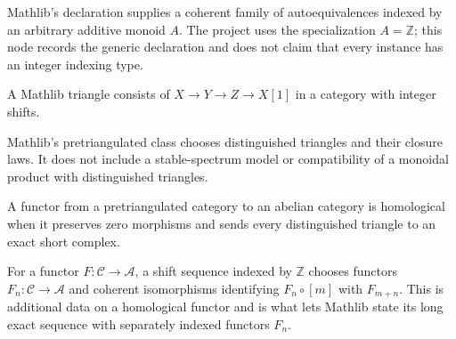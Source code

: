 \begin{definition}
  \label{def:mathlib-shift}
  \mathlibok
  Mathlib's declaration supplies a coherent family of autoequivalences indexed
  by an arbitrary additive monoid $A$.  The project uses the specialization
  $A=\mathbb Z$; this node records the generic declaration and does not claim
  that every instance has an integer indexing type.
\end{definition}

\begin{definition}
  \label{def:mathlib-triangle}
  \mathlibok
  A Mathlib triangle consists of $X\to Y\to Z\to X[1]$ in a category with
  integer shifts.
\end{definition}

\begin{definition}
  \label{def:mathlib-pretriangulated}
  \mathlibok
  Mathlib's pretriangulated class chooses distinguished triangles and their
  closure laws.  It does not include a stable-spectrum model or compatibility
  of a monoidal product with distinguished triangles.
\end{definition}

\begin{definition}
  \label{def:mathlib-homological-functor}
  \mathlibok
  A functor from a pretriangulated category to an abelian category is
  homological when it preserves zero morphisms and sends every distinguished
  triangle to an exact short complex.
\end{definition}

\begin{definition}
  \label{def:mathlib-homological-shift-sequence}
  \mathlibok
  For a functor $F:\mathcal C\to\mathcal A$, a shift sequence indexed by
  $\mathbb Z$ chooses functors $F_n:\mathcal C\to\mathcal A$ and coherent
  isomorphisms identifying $F_n\circ[m]$ with $F_{m+n}$.  This is additional
  data on a homological functor and is what lets Mathlib state its long exact
  sequence with separately indexed functors $F_n$.
\end{definition}

